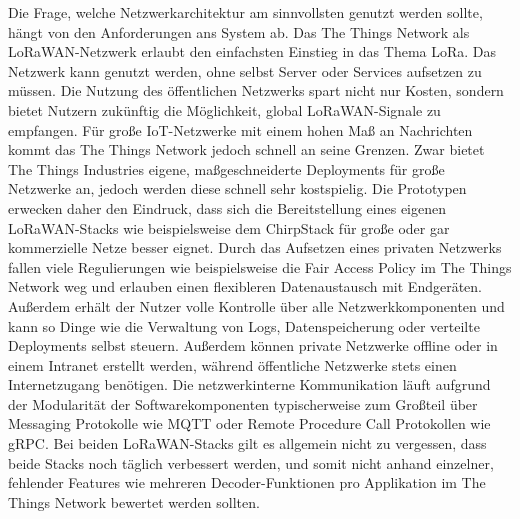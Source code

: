 Die Frage, welche Netzwerkarchitektur am sinnvollsten genutzt werden sollte, hängt von den Anforderungen ans System ab. Das The Things Network als LoRaWAN-Netzwerk erlaubt den einfachsten Einstieg in das Thema LoRa. Das Netzwerk kann genutzt werden, ohne selbst Server oder Services aufsetzen zu müssen. Die Nutzung des öffentlichen Netzwerks spart nicht nur Kosten, sondern bietet Nutzern zukünftig die Möglichkeit, global LoRaWAN-Signale zu empfangen. Für große IoT-Netzwerke mit einem hohen Maß an Nachrichten kommt das The Things Network jedoch schnell an seine Grenzen. Zwar bietet The Things Industries eigene, maßgeschneiderte Deployments für große Netzwerke an, jedoch werden diese schnell sehr kostspielig. Die Prototypen erwecken daher den Eindruck, dass sich die Bereitstellung eines eigenen LoRaWAN-Stacks wie beispielsweise dem ChirpStack für große oder gar kommer\-zielle Netze besser eignet. Durch das Aufsetzen eines privaten Netzwerks fallen viele Regulierungen wie beispielsweise die Fair Access Policy im The Things Network weg und erlauben einen flexibleren Datenaustausch mit Endgeräten. Außerdem erhält der Nutzer volle Kontrolle über alle Netzwerkkomponenten und kann so Dinge wie die Verwaltung von Logs, Datenspeicherung oder verteilte Deployments selbst steuern. Außerdem können private Netzwerke offline oder in einem Intranet erstellt werden, während öffentliche Netzwerke stets einen Internetzugang benötigen. Die netzwerkinterne Kommunikation läuft aufgrund der Modularität der Softwarekomponenten typischerweise zum Großteil über Messaging Protokolle wie MQTT oder Remote Procedure Call Protokollen wie gRPC. Bei beiden LoRaWAN-Stacks gilt es allgemein nicht zu vergessen, dass beide Stacks noch täglich verbessert werden, und somit nicht anhand einzelner, fehlender Features wie mehreren Decoder-Funktionen pro Applikation im The Things Network bewertet werden sollten. 

